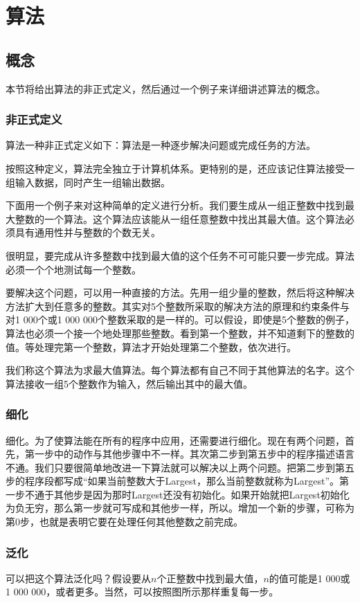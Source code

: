 \chapter{算法}
\section{概念}
本节将给出算法的非正式定义，然后通过一个例子来详细讲述算法的概念。
\subsection{非正式定义}
算法一种非正式定义如下：算法是一种逐步解决问题或完成任务的方法。

按照这种定义，算法完全独立于计算机体系。更特别的是，还应该记住算法接受一组输入数据，同时产生一组输出数据。

下面用一个例子来对这种简单的定义进行分析。我们要生成从一组正整数中找到最大整数的一个算法。这个算法应该能从一组任意整数中找出其最大值。这个算法必须具有通用性并与整数的个数无关。

很明显，要完成从许多整数中找到最大值的这个任务不可可能只要一步完成。算法必须一个个地测试每一个整数。

要解决这个问题，可以用一种直接的方法。先用一组少量的整数，然后将这种解决方法扩大到任意多的整数。其实对5个整数所采取的解决方法的原理和约束条件与对1 000个或1 000 000个整数采取的是一样的。可以假设，即使是5个整数的例子，算法也必须一个接一个地处理那些整数。看到第一个整数，并不知道剩下的整数的值。等处理完第一个整数，算法才开始处理第二个整数，依次进行。

我们称这个算法为求最大值算法。每个算法都有自己不同于其他算法的名字。这个算法接收一组5个整数作为输入，然后输出其中的最大值。
\subsection{细化}
细化。为了使算法能在所有的程序中应用，还需要进行细化。现在有两个问题，首先，第一步中的动作与其他步骤中不一样。其次第二步到第五步中的程序描述语言不通。我们只要很简单地改进一下算法就可以解决以上两个问题。把第二步到第五步的程序段都写成“如果当前整数大于Largest，那么当前整数就称为Largest”。第一步不通于其他步是因为那时Largest还没有初始化。如果开始就把Largest初始化为负无穷，那么第一步就可写成和其他步一样，所以。增加一个新的步骤，可称为第0步，也就是表明它要在处理任何其他整数之前完成。
\subsection{泛化}
可以把这个算法泛化吗？假设要从$n$个正整数中找到最大值，$n$的值可能是1 000或1 000 000，或者更多。当然，可以按照图所示那样重复每一步。

